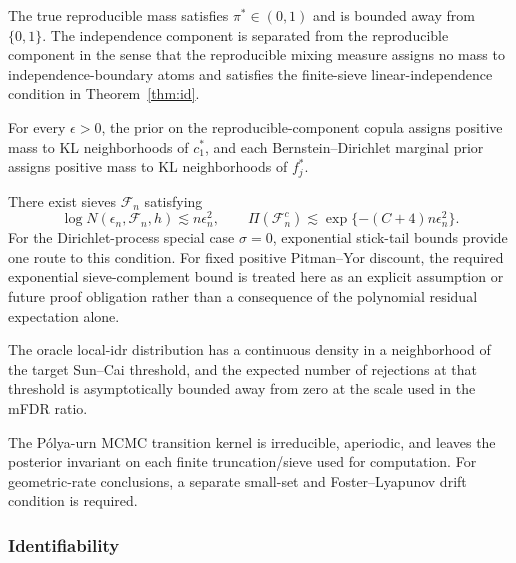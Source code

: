 \begin{assumption}
\label{ass:pi}
The true reproducible mass satisfies $\pi^*\in(0,1)$ and is bounded away from $\{0,1\}$. The independence component is separated from the reproducible component in the sense that the reproducible mixing measure assigns no mass to independence-boundary atoms and satisfies the finite-sieve linear-independence condition in Theorem~\ref{thm:id}.
\end{assumption}

\begin{assumption}
\label{ass:kl}
For every $\epsilon>0$, the prior on the reproducible-component copula assigns positive mass to KL neighborhoods of $c_1^*$, and each Bernstein--Dirichlet marginal prior assigns positive mass to KL neighborhoods of $f_j^*$.
\end{assumption}

\begin{assumption}
\label{ass:py}
There exist sieves $\mathcal F_n$ satisfying
\[
\log N(\epsilon_n,\mathcal F_n,h)\lesssim n\epsilon_n^2,
\qquad
\Pi(\mathcal F_n^c)\lesssim \exp\{-(C+4)n\epsilon_n^2\}.
\]
For the Dirichlet-process special case $\sigma=0$, exponential stick-tail bounds provide one route to this condition. For fixed positive Pitman--Yor discount, the required exponential sieve-complement bound is treated here as an explicit assumption or future proof obligation rather than a consequence of the polynomial residual expectation alone.
\end{assumption}

\begin{assumption}
\label{ass:decision}
The oracle local-idr distribution has a continuous density in a neighborhood of the target Sun--Cai threshold, and the expected number of rejections at that threshold is asymptotically bounded away from zero at the scale used in the mFDR ratio.
\end{assumption}

\begin{assumption}
\label{ass:slice}
The P\'olya-urn MCMC transition kernel is irreducible, aperiodic, and leaves the posterior invariant on each finite truncation/sieve used for computation. For geometric-rate conclusions, a separate small-set and Foster--Lyapunov drift condition is required.
\end{assumption}

\subsubsection{Identifiability}


